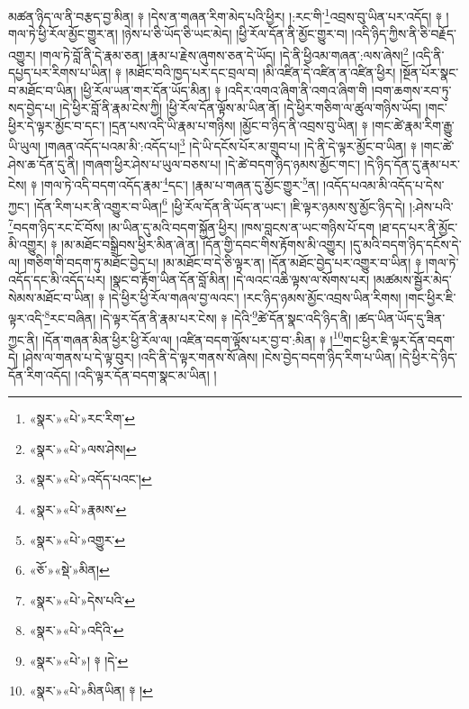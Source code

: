 མཚན་ཉིད་ལ་ནི་བརྩད་བྱ་མིན། ༈ །དེས་ན་གཞན་རིག་མེད་པའི་ཕྱིར། །:རང་གི་\footnote{«སྣར་»«པེ་»རང་རིག་}འབྲས་བུ་ཡིན་པར་འདོད། ༈ །གལ་ཏེ་ཕྱི་རོལ་མྱོང་གྱུར་ན། །ཉེས་པ་ཅི་ཡོད་ཅི་ཡང་མེད། །ཕྱི་རོལ་དོན་ནི་མྱོང་གྱུར་བ། །འདི་ཉིད་ཀྱིས་ནི་ཅི་བརྗོད་འགྱུར། །གལ་ཏེ་བློ་ནི་དེ་རྣམ་ཅན། །རྣམ་པ་རྗེས་ཞུགས་ཅན་དེ་ཡོད། །དེ་ནི་ཕྱིའམ་གཞན་:ལས་ཞེས།\footnote{«སྣར་»«པེ་»ལས་ཤེས།} །འདི་ནི་དཔྱད་པར་རིགས་པ་ཡིན། ༈ །མཐོང་བའི་ཁྱད་པར་དང་བྲལ་བ། །མི་འཛིན་དེ་འཛིན་ན་འཛིན་ཕྱིར། །སྔོན་པོར་སྣང་བ་མཐོང་བ་ཡིན། །ཕྱི་རོལ་ཡན་གར་དོན་ཡོད་མིན། ༈ །འདིར་འགའ་ཞིག་ནི་འགའ་ཞིག་གི །བག་ཆགས་རབ་ཏུ་སད་བྱེད་པ། །དེ་ཕྱིར་བློ་ནི་རྣམ་ངེས་ཀྱི། །ཕྱི་རོལ་དོན་ལྟོས་མ་ཡིན་ནོ། །དེ་ཕྱིར་གཅིག་ལ་ཚུལ་གཉིས་ཡོད། །གང་ཕྱིར་དེ་ལྟར་མྱོང་བ་དང་། །དྲན་པས་འདི་ཡི་རྣམ་པ་གཉིས། །མྱོང་བ་ཉིད་ནི་འབྲས་བུ་ཡིན། ༈ །གང་ཚེ་རྣམ་རིག་རྒྱུ་ཡི་ཡུལ། །གཞན་འདོད་པའམ་མི་:འདོད་པ།\footnote{«སྣར་»«པེ་»འདོད་པའང་།} །དེ་ཡི་དངོས་པོར་མ་གྲུབ་པ། །དེ་ནི་དེ་ལྟར་མྱོང་བ་ཡིན། ༈ །གང་ཚེ་ཤེས་ཆ་དོན་དུ་ནི། །གཞག་ཕྱིར་ཤེས་པ་ཡུལ་བཅས་པ། །དེ་ཚེ་བདག་ཉིད་ཉམས་མྱོང་གང་། །དེ་ཉིད་དོན་དུ་རྣམ་པར་ངེས། ༈ །གལ་ཏེ་འདི་བདག་འདོད་རྣམ་\footnote{«སྣར་»«པེ་»རྣམས་}དང་། །རྣམ་པ་གཞན་དུ་མྱོང་གྱུར་\footnote{«སྣར་»«པེ་»འགྱུར་}ན། །འདོད་པའམ་མི་འདོད་པ་དེས་ཀྱང་། །དོན་རིག་པར་ནི་འགྱུར་བ་ཡིན།\footnote{«ཅོ་»«སྡེ་»མིན།} །ཕྱི་རོལ་དོན་ནི་ཡོད་ན་ཡང་། །ཇི་ལྟར་ཉམས་སུ་མྱོང་ཉིད་དེ། །:ཤེས་པའི་\footnote{«སྣར་»«པེ་»དེས་པའི་}བདག་ཉིད་རང་ངོ་བོས། །མ་ཡིན་དུ་མའི་བདག་སྐྱོན་ཕྱིར། །ཁས་བླངས་ན་ཡང་གཉིས་པོ་དག །ཐ་དད་པར་ནི་མྱོང་མི་འགྱུར། ༈ །མ་མཐོང་བསྒྲིབས་ཕྱིར་མིན་ཞེ་ན། །དོན་གྱི་དབང་གིས་རྟོགས་མི་འགྱུར། །དུ་མའི་བདག་ཉིད་དངོས་དེ་ལ། །གཅིག་གི་བདག་ཏུ་མཐོང་བྱེད་པ། །མ་མཐོང་བ་དེ་ཅི་ལྟར་ན། །དོན་མཐོང་བྱེད་པར་འགྱུར་བ་ཡིན། ༈ །གལ་ཏེ་འདོད་དང་མི་འདོད་པར། །སྣང་བ་རྟོག་ཡིན་དོན་བློ་མིན། །དེ་ལའང་འཆི་ལྟས་ལ་སོགས་པར། །མཚམས་སྦྱོར་མེད་སེམས་མཐོང་བ་ཡིན། ༈ །དེ་ཕྱིར་ཕྱི་རོལ་གཞལ་བྱ་ལའང་། །རང་ཉིད་ཉམས་མྱོང་འབྲས་ཡིན་རིགས། །གང་ཕྱིར་ཇི་ལྟར་འདི་\footnote{«སྣར་»«པེ་»འདིའི་}རང་བཞིན། །དེ་ལྟར་དོན་ནི་རྣམ་པར་ངེས། ༈ །དེའི་\footnote{«སྣར་»«པེ་»། ༈ །དེ་}ཚེ་དོན་སྣང་འདི་ཉིད་ནི། །ཚད་ཡིན་ཡོད་དུ་ཟིན་ཀྱང་ནི། །དོན་གཞན་མིན་ཕྱིར་ཕྱི་རོལ་ལ། །འཛིན་བདག་ལྟོས་པར་བྱ་བ་:མིན། ༈ །\footnote{«སྣར་»«པེ་»མིནཡིན། ༈ །}གང་ཕྱིར་ཇི་ལྟར་དོན་བདག་དེ། །ཤེས་ལ་གནས་པ་དེ་ལྟ་བུར། །འདི་ནི་དེ་ལྟར་གནས་སོ་ཞེས། །ངེས་བྱེད་བདག་ཉིད་རིག་པ་ཡིན། །དེ་ཕྱིར་དེ་ཉིད་དོན་རིག་འདོད། །འདི་ལྟར་དོན་བདག་སྣང་མ་ཡིན། །
